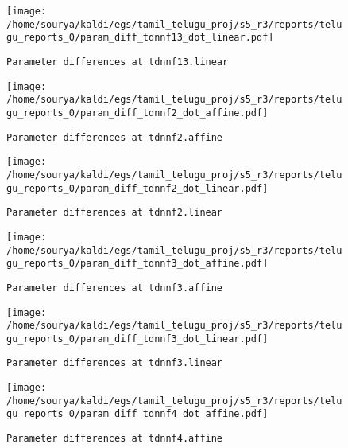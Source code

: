 \documentclass[prl,10pt,twocolumn]{revtex4}
\begin{document}
\newpage
\begin{figure}[h]
  \begin{center}
    \caption{\texttt{Parameter differences at tdnnf13.linear}}
    \texttt{[image: /home/sourya/kaldi/egs/tamil\_telugu\_proj/s5\_r3/reports/telugu\_reports\_0/param\_diff\_tdnnf13\_dot\_linear.pdf]}
  \end{center}
\end{figure}
\clearpage


\newpage
\begin{figure}[h]
  \begin{center}
    \caption{\texttt{Parameter differences at tdnnf2.affine}}
    \texttt{[image: /home/sourya/kaldi/egs/tamil\_telugu\_proj/s5\_r3/reports/telugu\_reports\_0/param\_diff\_tdnnf2\_dot\_affine.pdf]}
  \end{center}
\end{figure}
\clearpage


\newpage
\begin{figure}[h]
  \begin{center}
    \caption{\texttt{Parameter differences at tdnnf2.linear}}
    \texttt{[image: /home/sourya/kaldi/egs/tamil\_telugu\_proj/s5\_r3/reports/telugu\_reports\_0/param\_diff\_tdnnf2\_dot\_linear.pdf]}
  \end{center}
\end{figure}
\clearpage


\newpage
\begin{figure}[h]
  \begin{center}
    \caption{\texttt{Parameter differences at tdnnf3.affine}}
    \texttt{[image: /home/sourya/kaldi/egs/tamil\_telugu\_proj/s5\_r3/reports/telugu\_reports\_0/param\_diff\_tdnnf3\_dot\_affine.pdf]}
  \end{center}
\end{figure}
\clearpage


\newpage
\begin{figure}[h]
  \begin{center}
    \caption{\texttt{Parameter differences at tdnnf3.linear}}
    \texttt{[image: /home/sourya/kaldi/egs/tamil\_telugu\_proj/s5\_r3/reports/telugu\_reports\_0/param\_diff\_tdnnf3\_dot\_linear.pdf]}
  \end{center}
\end{figure}
\clearpage


\newpage
\begin{figure}[h]
  \begin{center}
    \caption{\texttt{Parameter differences at tdnnf4.affine}}
    \texttt{[image: /home/sourya/kaldi/egs/tamil\_telugu\_proj/s5\_r3/reports/telugu\_reports\_0/param\_diff\_tdnnf4\_dot\_affine.pdf]}
  \end{center}
\end{figure}
\clearpage
\end{document}
